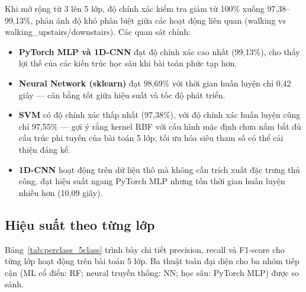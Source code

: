 Khi mở rộng từ 3 lên 5 lớp, độ chính xác kiểm tra giảm từ 100\% xuống 97,38--99,13\%, phản ánh độ khó phân biệt giữa các hoạt động liên quan (walking vs walking\_upstairs/downstairs). Các quan sát chính:
\begin{itemize}
    \item \textbf{PyTorch MLP và 1D-CNN} đạt độ chính xác cao nhất (99,13\%), cho thấy lợi thế của các kiến trúc học sâu khi bài toán phức tạp hơn.
    \item \textbf{Neural Network (sklearn)} đạt 98,69\% với thời gian huấn luyện chỉ 0,42 giây --- cân bằng tốt giữa hiệu suất và tốc độ phát triển.
    \item \textbf{SVM} có độ chính xác thấp nhất (97,38\%), với độ chính xác huấn luyện cũng chỉ 97,55\% --- gợi ý rằng kernel RBF với cấu hình mặc định chưa nắm bắt đủ cấu trúc phi tuyến của bài toán 5 lớp; tối ưu hóa siêu tham số có thể cải thiện đáng kể.
    \item \textbf{1D-CNN} hoạt động trên dữ liệu thô mà không cần trích xuất đặc trưng thủ công, đạt hiệu suất ngang PyTorch MLP nhưng tốn thời gian huấn luyện nhiều hơn (10,09 giây).
\end{itemize}

\subsection{Hiệu suất theo từng lớp}
\label{sec:per_class_results}

Bảng~\ref{tab:perclass_5class} trình bày chi tiết precision, recall và F1-score cho từng lớp hoạt động trên bài toán 5 lớp. Ba thuật toán đại diện cho ba nhóm tiếp cận (ML cổ điển: RF; neural truyền thống: NN; học sâu: PyTorch MLP) được so sánh.


